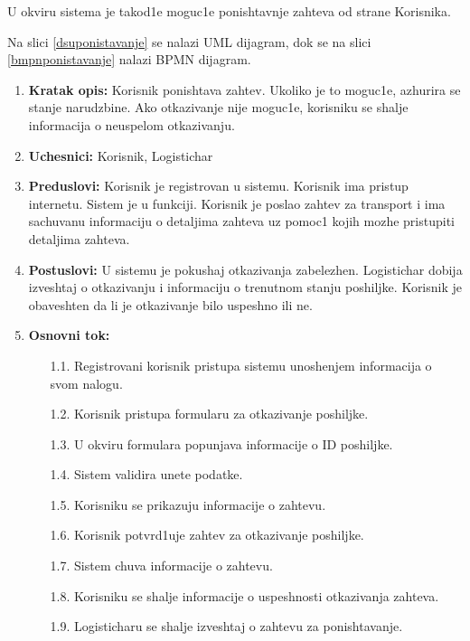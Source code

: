 
U okviru sistema je takod1e moguc1e ponishtavnje zahteva od strane Korisnika.

Na slici \ref{dsuponistavanje} se nalazi UML dijagram, dok se na slici \ref{bmpnponistavanje} nalazi BPMN dijagram.


\begin{enumerate}
    \item \textbf{Kratak opis:} Korisnik ponishtava zahtev. Ukoliko je to moguc1e, azhurira se stanje narudzbine. Ako otkazivanje nije moguc1e, korisniku se shalje informacija o neuspelom otkazivanju.
    
    \item \textbf{Uchesnici:} Korisnik, Logistichar
    \item \textbf{Preduslovi:} Korisnik je registrovan u sistemu. Korisnik ima pristup internetu. Sistem je u funkciji. Korisnik je poslao zahtev za transport i ima sachuvanu informaciju o detaljima zahteva uz pomoc1 kojih mozhe pristupiti detaljima zahteva.
    
    \item \textbf{Postuslovi:} U sistemu je pokushaj otkazivanja zabelezhen. Logistichar dobija izveshtaj o otkazivanju i informaciju o trenutnom stanju poshiljke. Korisnik je obaveshten da li je otkazivanje bilo uspeshno ili ne. 
    \item \textbf{Osnovni tok:}
        \begin{enumerate}
            \item[1.1.] Registrovani korisnik pristupa sistemu unoshenjem informacija o svom nalogu.
            
            \item[1.2.] Korisnik pristupa formularu za otkazivanje poshiljke.
            \item[1.3.] U okviru formulara popunjava informacije o ID poshiljke.
            \item[1.4.] Sistem validira unete podatke.
            \item[1.5.] Korisniku se prikazuju informacije o zahtevu.
            \item[1.6.] Korisnik potvrd1uje zahtev za otkazivanje poshiljke. 
            \item[1.7.] Sistem chuva informacije o zahtevu.
            \item[1.8.] Korisniku se shalje informacije o uspeshnosti otkazivanja zahteva.
            \item[1.9.] Logisticharu se shalje izveshtaj o zahtevu za ponishtavanje.
            

\end{enumerate}
\end{enumerate}
